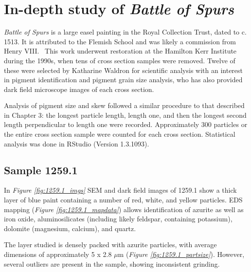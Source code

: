 
\chapter{In-depth study of \textit{Battle of Spurs}}


\graphicspath{{Chapter4/Figs/Raster/}{Chapter4/Figs/PDF/}{Chapter4/Figs/}}


\textit{Battle of Spurs} is a large easel painting in the Royal Collection Trust, dated to c. 1513. It is attributed to the Flemish School and was likely a commission from Henry VIII.~\autocite{rct} This work underwent restoration at the Hamilton Kerr Institute during the 1990s, when tens of cross section samples were removed. Twelve of these were selected by Katharine Waldron for scientific analysis with an interest in pigment identification and pigment grain size analysis, who has also provided dark field microscope images of each cross section. 

Analysis of pigment size and skew followed a similar procedure to that described in Chapter 3: the longest particle length, length one, and then the longest second length perpendicular to length one were recorded. Approximately 300 particles or the entire cross section sample were counted for each cross section. Statistical analysis was done in RStudio (Version 1.3.1093).


\section{Sample 1259.1}

In \textit{Figure \ref{fig:1259.1_imgs}} SEM and dark field images of 1259.1 show a thick layer of blue paint containing a number of red, white, and yellow particles. EDS mapping (\textit{Figure \ref{fig:1259.1_mapdata}}) allows identification of azurite as well as iron oxide, aluminosilicates (including likely feldspar, containing potassium), dolomite (magnesium, calcium), and quartz.

The layer studied is densely packed with azurite particles, with average dimensions of approximately 5 x 2.8 $\mu$m (\textit{Figure \ref{fig:1259.1_partsize}}). However, several outliers are present in the sample, showing inconsistent grinding.

